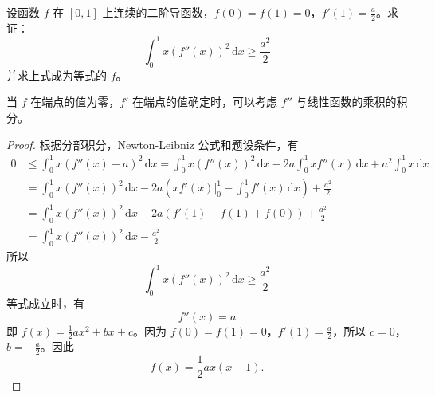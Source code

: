 \documentclass[../../main.tex]{subfiles}%
\begin{document}
\begin{example}
设函数 \( f \) 在 \([0,1]\) 上连续的二阶导函数，\( f(0) = f(1) = 0 \)，\( f'(1) = \frac{a}{2} \)。求证：
\[
\int_{0}^{1} x(f''(x))^2 \, \mathrm{d}x \geqslant \frac{a^2}{2}
\]
并求上式成为等式的 \( f \)。
\end{example}
\begin{remark}
当 \( f \) 在端点的值为零，\( f' \) 在端点的值确定时，可以考虑 \( f'' \) 与线性函数的乘积的积分。
\end{remark}
\begin{proof}
根据分部积分，Newton-Leibniz 公式和题设条件，有
\begin{align*}
0 &\leqslant \int_{0}^{1} x(f''(x) - a)^2 \, \mathrm{d}x = \int_{0}^{1} x(f''(x))^2 \, \mathrm{d}x - 2a \int_{0}^{1} x f''(x) \, \mathrm{d}x + a^2 \int_{0}^{1} x \, \mathrm{d}x \\
&= \int_{0}^{1} x(f''(x))^2 \, \mathrm{d}x - 2a \left( x f'(x)\big|_{0}^{1} - \int_{0}^{1} f'(x) \, \mathrm{d}x \right) + \frac{a^2}{2} \\
&= \int_{0}^{1} x(f''(x))^2 \, \mathrm{d}x - 2a \left( f'(1) - f(1) + f(0) \right) + \frac{a^2}{2} \\
&= \int_{0}^{1} x(f''(x))^2 \, \mathrm{d}x - \frac{a^2}{2}
\end{align*}
所以
\[
\int_{0}^{1} x(f''(x))^2 \, \mathrm{d}x \geqslant \frac{a^2}{2}
\]
等式成立时，有
\[
f''(x) = a
\]
即 \( f(x) = \frac{1}{2} a x^2 + b x + c \)。因为 \( f(0) = f(1) = 0 \)，\( f'(1) = \frac{a}{2} \)，所以 \( c = 0 \)，\( b = -\frac{a}{2} \)。因此
\[
f(x) = \frac{1}{2} a x(x - 1).
\]
\end{proof}
\end{document}
